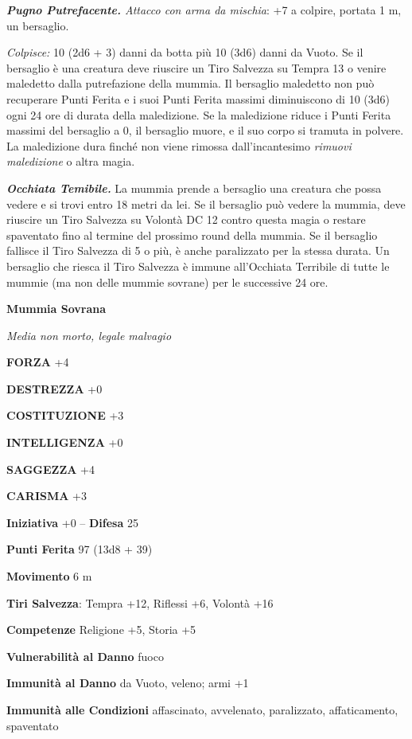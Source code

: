 \begin{multicols}{2}
\textit{\textbf{Pugno Putrefacente.} Attacco con arma da mischia}: +7 a colpire, portata 1 m, un bersaglio.

\textit{Colpisce:} 10 (2d6 + 3) danni da botta più 10 (3d6) danni da Vuoto. Se il bersaglio è una creatura deve riuscire un Tiro Salvezza su Tempra 13 o venire maledetto dalla putrefazione della mummia. Il bersaglio maledetto non può recuperare Punti Ferita e i suoi Punti Ferita massimi diminuiscono di 10 (3d6) ogni 24 ore di durata della maledizione. Se la maledizione riduce i Punti Ferita massimi del bersaglio a 0, il bersaglio muore, e il suo corpo si tramuta in polvere. La maledizione dura finché non viene rimossa dall'incantesimo \textit{rimuovi maledizione} o altra magia.

\textit{\textbf{Occhiata Temibile.}} La mummia prende a bersaglio una creatura che possa vedere e si trovi entro 18 metri da lei. Se il bersaglio può vedere la mummia, deve riuscire un Tiro Salvezza su Volontà DC 12 contro questa magia o restare spaventato fino al termine del prossimo round della mummia. Se il bersaglio fallisce il Tiro Salvezza di 5 o più, è anche paralizzato per la stessa durata. Un bersaglio che riesca il Tiro Salvezza è immune all'Occhiata Terribile di tutte le mummie (ma non delle mummie sovrane) per le successive 24 ore.

\medskip{}\textbf{Mummia Sovrana}

\textit{Media non morto, legale malvagio}

\textbf{FORZA} +4

\textbf{DESTREZZA} +0

\textbf{COSTITUZIONE} +3

\textbf{INTELLIGENZA} +0

\textbf{SAGGEZZA} +4

\textbf{CARISMA} +3

\textbf{Iniziativa} +0 -- \textbf{Difesa} 25

\textbf{Punti Ferita} 97 (13d8 + 39)

\textbf{Movimento} 6 m

\textbf{Tiri Salvezza}: Tempra +12, Riflessi +6, Volontà +16

\textbf{Competenze} Religione +5, Storia +5

\textbf{Vulnerabilità al Danno} fuoco

\textbf{Immunità al Danno} da Vuoto, veleno; armi +1

\textbf{Immunità alle Condizioni} affascinato, avvelenato, paralizzato, affaticamento, spaventato


\end{multicols}
